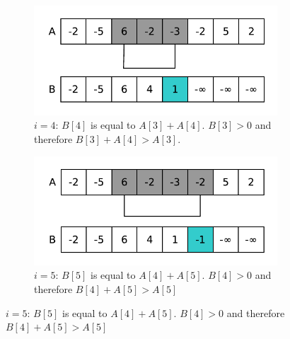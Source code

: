 \begin{figure}
	\begin{subfigure}[t]{0.48\textwidth}
		\centering
		\includegraphics[width=\textwidth]{sources/max_sum_continguous_subarray/images/kadane5}
		\caption{$i=4$: $B[4]$ is equal to $A[3]+A[4]$. $B[3] > 0$ and therefore $B[3]+A[4] > A[3]$.}
		\label{fig:median_sorted_array:kadane4}
	\end{subfigure}
	\hfill
	\begin{subfigure}[t]{0.48\textwidth}
		\centering
		\includegraphics[width=\textwidth]{sources/max_sum_continguous_subarray/images/kadane6}
		\caption{$i=5$: $B[5]$ is equal to $A[4]+A[5]$. $B[4] > 0$ and therefore $B[4]+A[5] > A[5]$}
		\label{fig:median_sorted_array:kadane5}
	\end{subfigure}
	\hfill


\end{figure}
